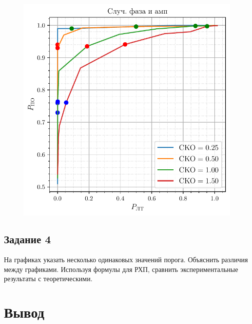 \begin{figure}[H]
	\centering
	\includegraphics[width =0.5\linewidth]{data/data_phase_amplitude.pdf}
	\caption{}
	\label{fig:1}
\end{figure}

\subsection{Задание 4}
На графиках указать несколько одинаковых значений порога. Объяснить
различия между графиками. Используя формулы для РХП, сравнить
экспериментальные результаты с теоретическими.
\section{Вывод}


